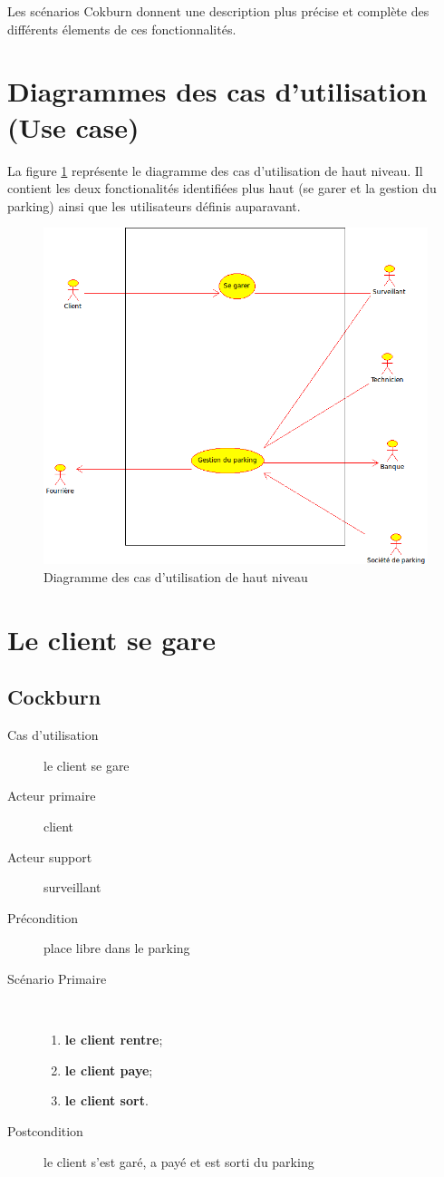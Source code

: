 \documentclass[a4paper]{article}
\begin{document}
Les sc\'enarios Cokburn donnent une description plus pr\'ecise et compl\`ete des diff\'erents
\'elements de ces fonctionnalit\'es.

\section{Diagrammes des cas d'utilisation (Use case)}
La figure \ref{usecase} repr\'esente le diagramme des cas d'utilisation
de haut niveau. Il contient les deux fonctionalit\'es identifi\'ees plus
haut (se garer et la gestion du parking) ainsi que les utilisateurs
d\'efinis auparavant.
\begin{figure}[!ht]
	\centering
	\includegraphics[scale=.7]{parking.png}
	\caption{\label{usecase} Diagramme des cas d'utilisation de haut niveau}
\end{figure}
\newpage

\section{Le client se gare}
\subsection{Cockburn}
\begin{description}
	\item[Cas d'utilisation] le client se gare
	\item[Acteur primaire] client
	\item[Acteur support] surveillant
	\item[Pr\'econdition] place libre dans le parking
	\item[Sc\'enario Primaire] \
	\begin{enumerate}
		\item \textbf{le client rentre};
		\item \textbf{le client paye};
		\item \textbf{le client sort}.
	\end{enumerate}
	\item[Postcondition] le client s'est gar\'e, a pay\'e et est sorti du parking
\end{description}
\end{document}
